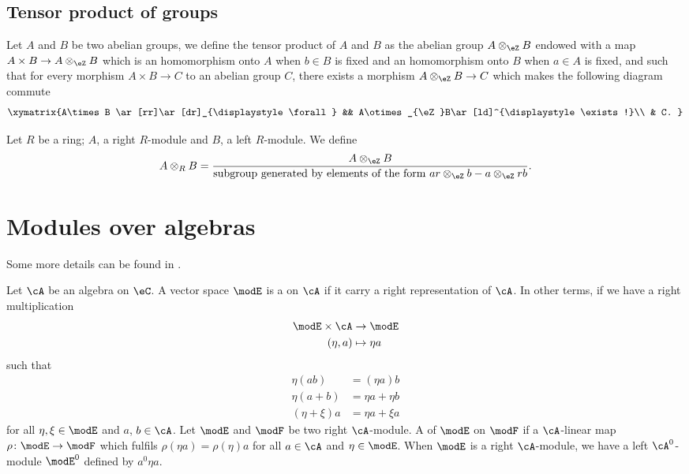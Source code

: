 \subsection{Tensor product of groups}

Let $A$ and $B$ be two abelian groups, we define the tensor product of $A$ and $B$ as the abelian group $A\otimes_{\eZ}B$ endowed with a map $A\times B\to A\otimes_{\eZ}B$ which is an homomorphism onto $A$ when $b\in B$ is fixed and an homomorphism onto $B$ when $a\in A$ is fixed, and such that for every morphism $A\times B\to C$ to an abelian group $C$, there exists a morphism $A\otimes_{\eZ}B\to C$ which makes the following diagram commute
\[
	\xymatrix{%
		A\times B \ar[rr]\ar[dr]_{\displaystyle\forall}		&&	A\otimes_{\eZ}B\ar[ld]^{\displaystyle\exists !}\\
		& C.
	}
\]

Let $R$ be a ring; $A$, a right $R$-module and $B$, a left $R$-module. We define
\begin{equation}		\label{EqdefAtensRB}
	A\otimes_RB=\frac{ A\otimes_{\eZ}B }{\text{subgroup generated by elements of the form }ar\otimes_{\eZ}b-a\otimes_{\eZ}rb}.
\end{equation}

\section{Modules over algebras}

Some more details can be found in \cite{Landi}.


Let $\cA$ be an algebra on $\eC$. A vector space $\modE$ is a  on $\cA$ if it carry a right representation of $\cA$. In other terms, if we have a right multiplication
\begin{equation}
	\begin{aligned}
		\modE\times\cA & \to \modE      \\
		(\eta,a)       & \mapsto \eta a
	\end{aligned}
\end{equation}
such that
\begin{subequations}
	\begin{align}
		\eta(ab)    & =(\eta a)b     \\
		\eta(a+b)   & =\eta a+\eta b \\
		(\eta+\xi)a & =\eta a+\xi a
	\end{align}
\end{subequations}
for all $\eta,\xi\in\modE$ and $a$, $b\in\cA$. Let $\modE$ and $\modF$ be two right $\cA$-module. A  of $\modE$ on $\modF$ if a $\cA$-linear map $\rho\colon \modE\to \modF$ which fulfils $\rho(\eta a)=\rho(\eta)a$ for all $a\in\cA$ and $\eta\in\modE$. When $\modE$ is a right $\cA$-module, we have a left $\cA^0$-module $\modE^0$ defined by $a^0\eta a$.


